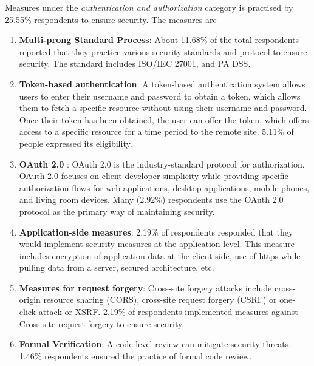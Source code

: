 Measures under the \emph{authentication and authorization} category is practised by 25.55\% respondents to ensure security. The measures are 
\begin{enumerate}[label=(\alph*)]

    \item \textbf{Multi-prong Standard Process}: About 11.68\% of the total respondents reported that they practice various security standards and protocol to ensure security. The standard includes ISO/IEC 27001, and PA DSS.
    
    \item \textbf{Token-based authentication}: A token-based authentication system allows users to enter their username and password to obtain a token, which allows them to fetch a specific resource without using their username and password. Once their token has been obtained, the user can offer the token, which offers access to a specific resource for a time period to the remote site. 5.11\% of people expressed its eligibility.
    
    \item \textbf{OAuth 2.0} : OAuth 2.0 is the industry-standard protocol for authorization. OAuth 2.0 focuses on client developer simplicity while providing specific authorization flows for web applications, desktop applications, mobile phones, and living room devices. Many (2.92\%) respondents use the OAuth 2.0 protocol as the primary way of maintaining security.
    
    \item \textbf{Application-side measures}: 2.19\% of respondents responded that they would implement security measures at the application level. This measure includes encryption of application data at the client-side, use of https while pulling data from a server, secured architecture, etc.
    
    \item \textbf{Measures for request forgery}: Cross-site forgery attacks include cross-origin resource sharing (CORS), cross-site request forgery (CSRF) or one-click attack or XSRF. 2.19\% of respondents implemented measures against  Cross-site request forgery to ensure security.
    
    \item \textbf{Formal Verification}: A code-level review can mitigate security threats. 1.46\% respondents ensured the practice of formal code review.
    
\end{enumerate}

